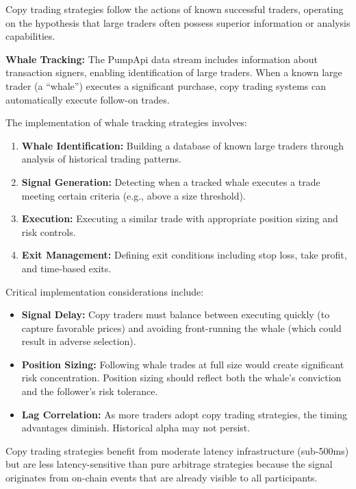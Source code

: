 \documentclass[12pt,a4paper]{article}
\begin{document}
Copy trading strategies follow the actions of known successful traders, operating on the hypothesis that large traders often possess superior information or analysis capabilities.

\textbf{Whale Tracking:} The PumpApi data stream includes information about transaction signers, enabling identification of large traders. When a known large trader (a ``whale'') executes a significant purchase, copy trading systems can automatically execute follow-on trades.

The implementation of whale tracking strategies involves:

\begin{enumerate}
\item \textbf{Whale Identification:} Building a database of known large traders through analysis of historical trading patterns.
\item \textbf{Signal Generation:} Detecting when a tracked whale executes a trade meeting certain criteria (e.g., above a size threshold).
\item \textbf{Execution:} Executing a similar trade with appropriate position sizing and risk controls.
\item \textbf{Exit Management:} Defining exit conditions including stop loss, take profit, and time-based exits.
\end{enumerate}

Critical implementation considerations include:

\begin{itemize}
\item \textbf{Signal Delay:} Copy traders must balance between executing quickly (to capture favorable prices) and avoiding front-running the whale (which could result in adverse selection).
\item \textbf{Position Sizing:} Following whale trades at full size would create significant risk concentration. Position sizing should reflect both the whale's conviction and the follower's risk tolerance.
\item \textbf{Lag Correlation:} As more traders adopt copy trading strategies, the timing advantages diminish. Historical alpha may not persist.
\end{itemize}

Copy trading strategies benefit from moderate latency infrastructure (sub-500ms) but are less latency-sensitive than pure arbitrage strategies because the signal originates from on-chain events that are already visible to all participants.
\end{document}
